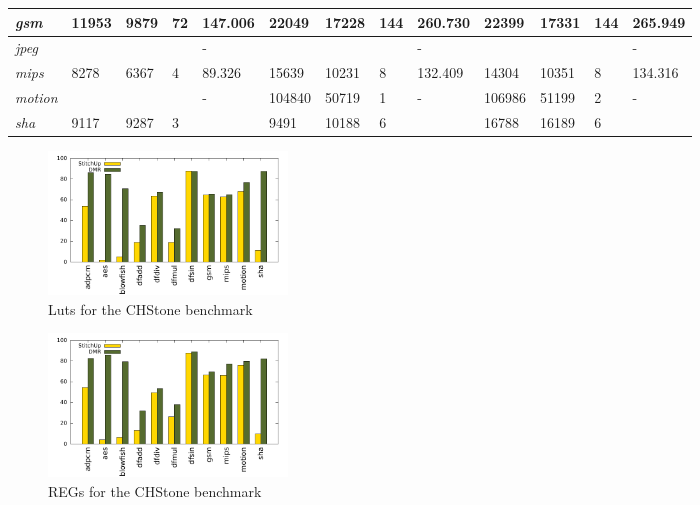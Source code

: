 \begin{table}[t]
\begin{tabular}{@{}|l|l|l|l|l|l|l|l|l|l|l|l|l|@{}}
\textit{gsm}        & 11953        & 9879         & 72           & 147.006        & 22049        & 17228        & 144          & 260.730        & 22399        & 17331        & 144          & 265.949        \\ \midrule
\textit{jpeg}       &              &              &              & -              &              &              &              & -              &              &              &              & -              \\ \midrule
\textit{mips}       & 8278         & 6367         & 4            & 89.326         & 15639        & 10231        & 8            & 132.409        & 14304        & 10351        & 8            & 134.316        \\ \midrule
\textit{motion}     &              &              &              & -              & 104840       & 50719        & 1            & -              & 106986       & 51199        & 2            & -              \\ \midrule
\textit{sha}        & 9117         & 9287         & 3            &                & 9491         & 10188        & 6            &                & 16788        & 16189        & 6            &                \\ \bottomrule
\end{tabular}
\end{table}


\begin{figure}[h]
\centering
\includegraphics[width=2.5in]{./graphs/chstone_luts_24_09_2015.pdf}
\caption{Luts for the CHStone benchmark}
\label{fig:luts_result}
\end{figure}

\begin{figure}[h]
\centering
\includegraphics[width=2.5in]{./graphs/chstone_reg_24_09_2015.pdf}
\caption{REGs for the CHStone benchmark}
\label{fig:regs_result}
\end{figure}

